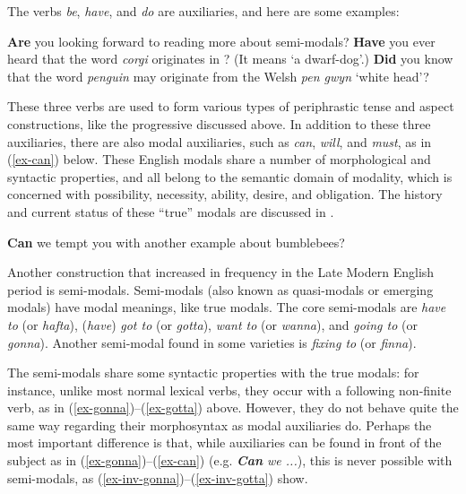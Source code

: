 The verbs \textit{be}, \textit{have}, and \textit{do} are auxiliaries, and here are some examples:

\begin{exe}
    \ex \textbf{Are} you looking forward to reading more about semi-modals?
    \ex \textbf{Have} you ever heard that the word \textit{corgi} originates in ? (It means `a dwarf-dog'.)
    \ex \textbf{Did} you know that the word \textit{penguin} may originate from the Welsh \textit{pen gwyn} `white head'?
\end{exe}

\noindent These three verbs are used to form various types of periphrastic tense and aspect constructions, like the progressive discussed above. In addition to these three auxiliaries, there are also modal auxiliaries, such as \textit{can}, \textit{will}, and \textit{must}, as in (\ref{ex-can}) below. These English modals share a number of morphological and syntactic properties, and all belong to the semantic domain of modality, which is concerned with possibility, necessity, ability, desire, and obligation. The history and current status of these ``true'' modals are discussed in .

\begin{exe}
    \ex\label{ex-can} \textbf{Can} we tempt you with another example about bumblebees?
\end{exe}

\noindent Another construction that increased in frequency in the Late Modern English period is semi-modals. Semi-modals (also known as quasi-modals or emerging modals) have modal meanings, like true modals. The core semi-modals are \textit{have to} (or \textit{hafta}), (\textit{have}) \textit{got to} (or \textit{gotta}), \textit{want to} (or \textit{wanna}), and \textit{going to} (or \textit{gonna}). Another semi-modal found in some varieties is \textit{fixing to} (or \textit{finna}).

The semi-modals share some syntactic properties with the true modals: for instance, unlike most normal lexical verbs, they occur with a following non-finite verb, as in (\ref{ex-gonna})--(\ref{ex-gotta}) above. However, they do not behave quite the same way regarding their morphosyntax as modal auxiliaries do. Perhaps the most important difference is that, while auxiliaries can be found in front of the subject as in (\ref{ex-gonna})--(\ref{ex-can}) (e.g. \textit{\textbf{Can} we ...}), this is never possible with semi-modals, as (\ref{ex-inv-gonna})--(\ref{ex-inv-gotta}) show.

